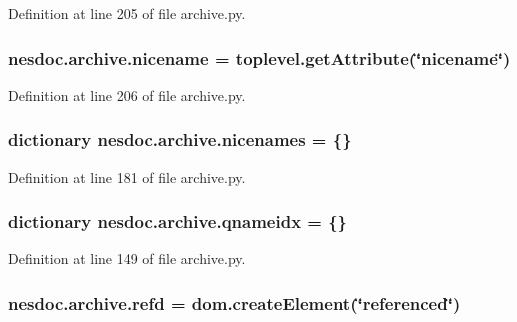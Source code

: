 Definition at line 205 of file archive.\+py.

\subsubsection[{\texorpdfstring{nicename}{nicename}}]{\setlength{\rightskip}{0pt plus 5cm}nesdoc.\+archive.\+nicename = toplevel.\+get\+Attribute(\char`\"{}nicename\char`\"{})}\hypertarget{namespacenesdoc_1_1archive_a099b2ce375913f82d15ca54759c823f5}{}\label{namespacenesdoc_1_1archive_a099b2ce375913f82d15ca54759c823f5}


Definition at line 206 of file archive.\+py.

\subsubsection[{\texorpdfstring{nicenames}{nicenames}}]{\setlength{\rightskip}{0pt plus 5cm}dictionary nesdoc.\+archive.\+nicenames = \{\}}\hypertarget{namespacenesdoc_1_1archive_a365ae62f9da8711f1b4d985793b9a517}{}\label{namespacenesdoc_1_1archive_a365ae62f9da8711f1b4d985793b9a517}


Definition at line 181 of file archive.\+py.

\subsubsection[{\texorpdfstring{qnameidx}{qnameidx}}]{\setlength{\rightskip}{0pt plus 5cm}dictionary nesdoc.\+archive.\+qnameidx = \{\}}\hypertarget{namespacenesdoc_1_1archive_a211c0217f300886586e4c906e1fa3dab}{}\label{namespacenesdoc_1_1archive_a211c0217f300886586e4c906e1fa3dab}


Definition at line 149 of file archive.\+py.

\subsubsection[{\texorpdfstring{refd}{refd}}]{\setlength{\rightskip}{0pt plus 5cm}nesdoc.\+archive.\+refd = dom.\+create\+Element(\char`\"{}referenced\char`\"{})}\hypertarget{namespacenesdoc_1_1archive_a26992b9c3618628c17d2a2815fd116b1}{}\label{namespacenesdoc_1_1archive_a26992b9c3618628c17d2a2815fd116b1}


